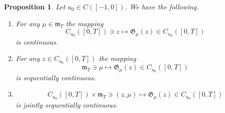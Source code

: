 \documentclass[reqno]{amsart}
\theoremstyle{plain}
\newtheorem{proposition}{Proposition}[section]
\numberwithin{equation}{section}
\numberwithin{definition}{section}
\begin{document}
\begin{proposition}
\label{prop:G_operator_continuous}
   Let $u_0\in C([-1, 0])$. We have the following.
   \begin{enumerate}[label=\textup{(}\roman*\textup{)}, ref=\textup{(}\emph{\roman*}\textup{)}]
   \item\label{prop:G_operator_continuous:i}
   For any $\mu\in\mathfrak{m}_T$ the mapping
   \begin{equation*}
           C_{u_0}([0,T]) \ni z
           \mapsto \mathfrak{G}_{\mu}(z)
           \in C_{u_0}([0,T])
   \end{equation*}
   is continuous.

   \item\label{prop:G_operator_continuous:ii}
   For any $z\in C_{u_0}([0,T])$ the mapping
   \begin{equation*}
           \mathfrak{m}_T \ni \mu
           \mapsto \mathfrak{G}_{\mu}(z)
           \in C_{u_0}([0,T])
   \end{equation*}
   is sequentially continuous.

   \item\label{prop:G_operator_continuous:iii}
   \begin{equation*}
           C_{u_0}([0,T]) \times \mathfrak{m}_T
           \ni (z,\mu)
           \mapsto \mathfrak{G}_{\mu}(z)
           \in C_{u_0}([0,T])
   \end{equation*}
   is jointly sequentially continuous.
   \end{enumerate}
\end{proposition}
\end{document}
